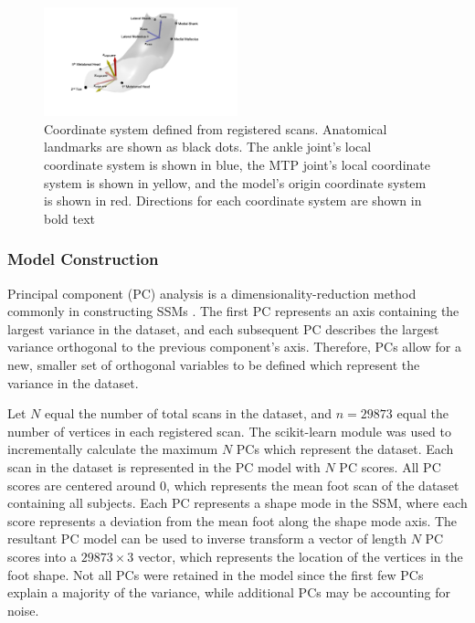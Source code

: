 \documentclass[defaultstyle,11pt]{comps}
\begin{document}
\begin{figure}
\hypertarget{fig:angles}{%
\centering
\includegraphics[width=0.5\textwidth,height=\textheight]{../fig/SA2/coordsystem.png}
\caption{Coordinate system defined from registered scans. Anatomical landmarks are shown as black dots. The ankle joint's local coordinate system is shown in blue, the MTP joint's local coordinate system is shown in yellow, and the model's origin coordinate system is shown in red. Directions for each coordinate system are shown in bold text}\label{fig:angles}
}
\end{figure}

\hypertarget{model-construction}{%
\subsubsection{Model Construction}\label{model-construction}}

Principal component (PC) analysis is a dimensionality-reduction method commonly in constructing SSMs \citep{Reed2008, Park2015a, Conrad2019, Stankovic2020}.
The first PC represents an axis containing the largest variance in the dataset, and each subsequent PC describes the largest variance orthogonal to the previous component's axis.
Therefore, PCs allow for a new, smaller set of orthogonal variables to be defined which represent the variance in the dataset.

Let \(N\) equal the number of total scans in the dataset, and \(n=29873\) equal the number of vertices in each registered scan. The scikit-learn module \citep{JMLR:v12:pedregosa11a} was used to incrementally calculate the maximum \(N\) PCs which represent the dataset.
Each scan in the dataset is represented in the PC model with \(N\) PC scores.
All PC scores are centered around 0, which represents the mean foot scan of the dataset containing all subjects.
Each PC represents a shape mode in the SSM, where each score represents a deviation from the mean foot along the shape mode axis. The resultant PC model can be used to inverse transform a vector of length \(N\) PC scores into a \(29873\times 3\) vector, which represents the location of the vertices in the foot shape. Not all PCs were retained in the model since the first few PCs explain a majority of the variance, while additional PCs may be accounting for noise.
\end{document}
